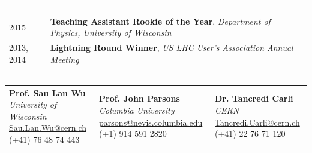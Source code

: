 \documentclass{letter}
\begin{document}
\vspace{-10pt}

\begin{flushleft}
\Large{\textsc{\textbf{\color{Maroon}{Awards}}}}
\vspace{1pt} %
\hrule
\end{flushleft}

\begin{tabular}{p{}p{}}
	2015
	&
	\textbf{Teaching Assistant Rookie of the Year}, \textit{Department of Physics, University of Wisconsin} 
\\
	2013, 2014
	& 
	\textbf{Lightning Round Winner}, \textit{US LHC User's Association Annual Meeting}
\\
\end{tabular}

\begin{flushleft}
\Large{\textsc{\textbf{\color{Maroon}{References}}}}
\hrule
\end{flushleft}

\begin{tabular}{p{}p{}p{}}
	\textbf{Prof. Sau Lan Wu} \newline
	\textit{University of Wisconsin} \newline
	\href{mailto:Sau.Lan.Wu@cern.ch}{Sau.Lan.Wu@cern.ch} \newline
	(+41) 76 48 74 443
	&
	\textbf{Prof. John Parsons} \newline
	\textit{Columbia University} \newline
	\href{mailto:parsons@nevis.columbia.edu}{parsons@nevis.columbia.edu} \newline
	(+1) 914 591 2820
	&
	\textbf{Dr. Tancredi Carli} \newline
	\textit{CERN} \newline
	\href{mailto:Tancredi.Carli@cern.ch}{Tancredi.Carli@cern.ch} \newline
	(+41) 22 76 71 120
\end{tabular}
\end{document}
